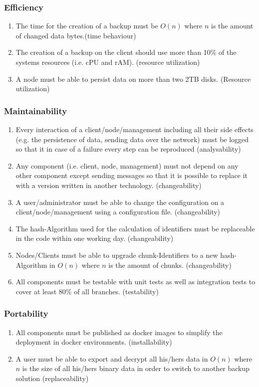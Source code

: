 \subsubsection{Efficiency}
\begin{enumerate}
	\enumcountrestore
	\item The time for the creation of a backup must be $O(n)$ where $n$ is the amount of changed data bytes.(time behaviour)
	\item The creation of a backup on the client should use more than 10\% of the systems resources (i.e. cPU and rAM). (resource utilization)
	\item A node must be able to persist data on more than two 2TB disks. (Resource utilization)
	\enumcountsave
\end{enumerate}

\subsubsection{Maintainability}
\begin{enumerate}
	\enumcountrestore
	\item Every interaction of a client/node/management including all their side effects (e.g. the persistence of data, sending data over the network) must be logged so that it in case of a failure every step can be reproduced (analysability)
	\item Any component (i.e. client, node, management) must not depend on any other component except sending messages so that it is possible to replace it with a version written in another technology. (changeability)
	\item A user/administrator must be able to change the configuration on a client/node/management using a configuration file. (changeability)
	\item The hash-Algorithm used for the calculation of identifiers must be replaceable in the code within one working day. (changeability)
	\item Nodes/Clients must be able to upgrade chunk-Identifiers to a new hash-Algorithm in $O(n)$ where $n$ is the amount of chunks. (changeability)
	\item All components must be testable with unit tests as well as integration tests to cover at least 80\% of all branches. (testability)
	\enumcountsave
\end{enumerate}

\subsubsection{Portability}

\begin{enumerate}
	\enumcountrestore
	\item All components must be published as docker images to simplify the deployment in docker environments. (installability)
	\item A user must be able to export and decrypt all his/hers data in $O(n)$ where $n$ is the size of all his/hers binary data in order to switch to another backup solution (replaceability)
	\enumcountsave
\end{enumerate}
